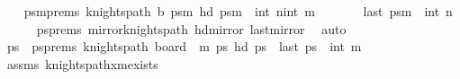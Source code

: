 \begin{isabellebody}
\ \ \isamarkupfalse%
\ psm{}{\isacharunderscore}{\kern0pt}prems{\isacharcolon}{\kern0pt}\ {\isachardoublequoteopen}knights{\isacharunderscore}{\kern0pt}path\ {\isacharquery}{\kern0pt}b\ {\isacharquery}{\kern0pt}psm{}{\isachardoublequoteclose}\ {\isachardoublequoteopen}hd\ {\isacharquery}{\kern0pt}psm{}\ {\isacharequal}{\kern0pt}\ {\isacharparenleft}{\kern0pt}int\ {\isacharparenleft}{\kern0pt}n{\isacharminus}{\kern0pt}{}{\isacharparenright}{\kern0pt}{\isacharcomma}{\kern0pt}int\ m{\isacharparenright}{\kern0pt}{\isachardoublequoteclose}\ \isanewline
\ \ \ \ \ \ {\isachardoublequoteopen}last\ {\isacharquery}{\kern0pt}psm{}\ {\isacharequal}{\kern0pt}\ {\isacharparenleft}{\kern0pt}int\ {\isacharparenleft}{\kern0pt}n{\isacharminus}{\kern0pt}{}{\isacharparenright}{\kern0pt}{\isacharminus}{\kern0pt}{}{\isacharcomma}{\kern0pt}{}{\isacharparenright}{\kern0pt}{\isachardoublequoteclose}\isanewline
\ \ \ \ \isamarkupfalse%
\ psprems\ mirror{}{\isacharunderscore}{\kern0pt}knights{\isacharunderscore}{\kern0pt}path\ hd{\isacharunderscore}{\kern0pt}mirror{}\ last{\isacharunderscore}{\kern0pt}mirror{}\ \isamarkupfalse%
\ auto\isanewline
\isanewline
\ \ \isamarkupfalse%
\ ps\ \ psprems{\isacharcolon}{\kern0pt}\ {\isachardoublequoteopen}knights{\isacharunderscore}{\kern0pt}path\ {\isacharparenleft}{\kern0pt}board\ {}\ m{\isacharparenright}{\kern0pt}\ ps\ {\isachardoublequoteopen}hd\ ps\ {\isacharequal}{\kern0pt}\ {\isacharparenleft}{\kern0pt}{}{\isacharcomma}{\kern0pt}{}{\isacharparenright}{\kern0pt}{\isachardoublequoteclose}{\isachardoublequoteopen}last\ ps\ {\isacharequal}{\kern0pt}\ {\isacharparenleft}{\kern0pt}{}{\isacharcomma}{\kern0pt}int\ m{\isacharminus}{\kern0pt}{}{\isacharparenright}{\kern0pt}{\isachardoublequoteclose}\isanewline
\ \ \ \ \isamarkupfalse%
\ assms\ knights{\isacharunderscore}{\kern0pt}path{\isacharunderscore}{\kern0pt}{}xm{\isacharunderscore}{\kern0pt}exists\ \isamarkupfalse%

\end{isabellebody}

